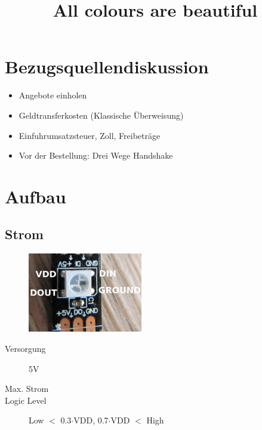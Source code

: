 \documentclass{beamer}
\title{All colours are beautiful}
\institute{MetaMeute}
\begin{document}
\begin{frame}
 \maketitle
\end{frame}

\section{Bezugsquellendiskussion}
\begin{frame}
\begin{itemize}
 \item Angebote einholen
 \item Geldtransferkosten (Klassische Überweisung)
 \item Einfuhrumsatzsteuer, Zoll, Freibeträge
 \item Vor der Bestellung: Drei Wege Handshake
\end{itemize}
\end{frame}

\section{Aufbau}
\subsection{Strom}
\begin{frame}
\begin{figure}[h]
 \centering
 \includegraphics[width=5cm,keepaspectratio=true]{./WS2812B_CloseUp.png}
\end{figure}

\begin{description}
\item[Versorgung] 5V
\item[Max. Strom]
\item[Logic Level] Low  $<$ 0.3$\cdot$VDD, 0.7$\cdot$VDD $<$ High
\end{description}

\end{frame}
\end{document}
